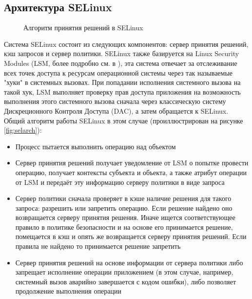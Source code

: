 \subsection{Архитектура SELinux} 
\begin{figure}
\centering
{} 
\caption{Алгоритм принятия решений в SELinux}
\end{figure}
Система SELinux состоит из следующих компонентов: сервер принятия
решений, кэш запросов и сервер политики.  SELinux также базируется на
Linux Security Modules (LSM, более подробно см. в \cite{LSM}), эта
система отвечает за отслеживание всех точек доступа к ресурсам
операционной системы через так называемые "хуки" в системных вызовах.
При попадании исполнения системного вызова на такой хук, LSM выполняет
проверку прав доступа приложения на возможность выполнения этого
системного вызова сначала через классическую систему Дискреционного
Контроля Доступа (DAC), а затем обращается к SELinux.  Общий алгоритм
работы SELinux в этом случае (проиллюстрирован на рисунке
\ref{fig:selarch}): 
\begin{itemize}
\item Процесс пытается выполнить операцию над объектом 
\item Сервер принятия решений получает уведомление от LSM о попытке
    провести операцию, получает контексты субъекта и объекта, а также
    атрибут операции от LSM и передаёт эту информацию серверу политики в
    виде запроса 
\item Сервер политики сначала проверяет в кэше наличие решения для
    такого запроса: разрешить или запретить операцию. Если решение
    найдено оно возвращается серверу принятия решения. Иначе ищется
    соответствующее правило в политике безопасности и на основе его
    принимается решение, помещается в кэш и опять же возвращается
    серверу принятия решений. Если правила не найдено то принимается
    решение запретить 
\item Сервер принятия решений на основе информации от сервера политики
    либо запрещает исполнение операции приложением (в этом случае,
    например, системный вызов аварийно завершается с кодом ошибки), либо
    позволяет продолжение выполнения операции 
\end{itemize}


